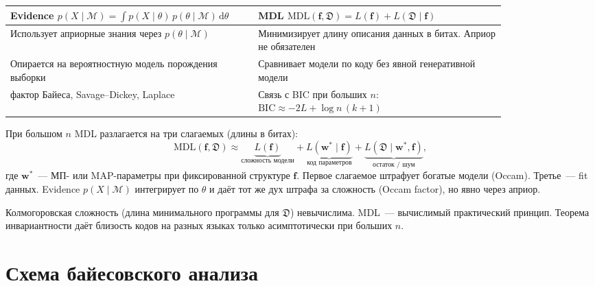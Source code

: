 \begin{center}
\small
\begin{tabular}{p{0.42\linewidth}|p{0.42\linewidth}}
\toprule
Evidence $p(X\mid\mathcal{M})=\int p(X\mid\theta)\,p(\theta\mid\mathcal{M})\,\mathrm{d}\theta$
& MDL $\mathrm{MDL}(\mathbf{f},\mathfrak{D})=L(\mathbf{f})+L(\mathfrak{D}\mid\mathbf{f})$ \\
\midrule
Использует априорные знания через $p(\theta\mid\mathcal{M})$
& Минимизирует длину описания данных в битах. Априор не обязателен \\
\midrule
Опирается на вероятностную модель порождения выборки
& Сравнивает модели по коду без явной генеративной модели \\
\midrule
фактор Байеса, Savage--Dickey, Laplace
& Связь с BIC при больших $n$: $\mathrm{BIC}\approx -2L+\log n\,(k{+}1)$ \\
\bottomrule
\end{tabular}
\end{center}

При большом $n$ MDL разлагается на три слагаемых (длины в битах): \[ \mathrm{MDL}(\mathbf{f},\mathfrak{D}) \approx \underbrace{L(\mathbf{f})}_{\text{сложность модели}} + \underbrace{L(\mathbf{w}^*\mid\mathbf{f})}_{\text{код параметров}} + \underbrace{L(\mathfrak{D}\mid\mathbf{w}^*,\mathbf{f})}_{\text{остаток / шум}}, \] где $\mathbf{w}^*$~--- МП- или MAP-параметры при фиксированной структуре $\mathbf{f}$.
Первое слагаемое штрафует богатые модели (Occam). Третье~--- fit данных.
Evidence $p(X\mid\mathcal{M})$ интегрирует по $\theta$ и даёт тот же дух штрафа за сложность (Occam factor), но явно через априор.

Колмогоровская сложность (длина минимального программы для $\mathfrak{D}$) невычислима. MDL~--- вычислимый практический принцип. Теорема инвариантности даёт близость кодов на разных языках только асимптотически при больших $n$.

\section{Схема байесовского анализа}

